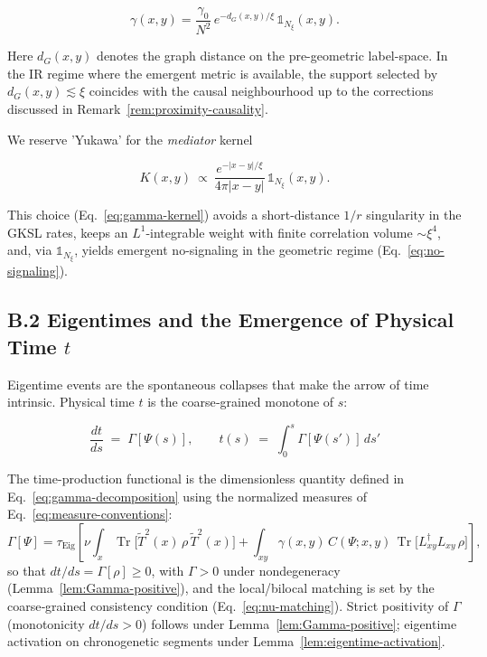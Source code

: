 \documentclass[12pt,a4paper]{article}
\renewcommand{\Tr}{\operatorname{Tr}}
\numberwithin{equation}{section}
\begin{document}
\vspace{0.5cm}

\[
\gamma(x,y)=\frac{\gamma_0}{N^2}\,e^{-d_G(x,y)/\xi}\,\mathbb{1}_{N_\xi}(x,y).
\]

\noindent Here $d_G(x,y)$ denotes the graph distance on the pre-geometric
label-space. In the IR regime where the emergent metric is available, the
support selected by $d_G(x,y)\lesssim \xi$ coincides with the causal
neighbourhood up to the corrections discussed in
Remark~\ref{rem:proximity-causality}.

\vspace{0.5cm}
\noindent We reserve 'Yukawa' for the \emph{mediator} kernel

\vspace{0.5cm}
\[
K(x,y)\ \propto\ \frac{e^{-|x-y|/\xi}}{4\pi |x-y|}\,\mathbb{1}_{N_\xi}(x,y).
\]

\vspace{0.5cm}

\noindent This choice (Eq.~\eqref{eq:gamma-kernel}) avoids a short-distance $1/r$ singularity in the GKSL rates, keeps an $L^1$-integrable weight with finite correlation volume $\sim\xi^4$, and, via $\mathbb{1}_{N_\xi}$, yields emergent no-signaling in the geometric regime (Eq.~\eqref{eq:no-signaling}). 

\vspace{0.8cm}

\subsection*{B.2 Eigentimes and the Emergence of Physical Time $t$}

\vspace{0.5cm}

Eigentime events are the spontaneous collapses that make the arrow of time intrinsic. Physical time $t$ is the coarse‑grained monotone of $s$:

\vspace{0.5cm}

\[
\frac{dt}{ds} \;=\; \Gamma[\Psi(s)],
\qquad
t(s) \;=\; \int_0^{s} \Gamma[\Psi(s')]\,ds'
\]

\vspace{0.5cm}

\noindent The time-production functional is the dimensionless quantity defined in
Eq.~\eqref{eq:gamma-decomposition} using the normalized measures of Eq.~\eqref{eq:measure-conventions}:
\[
\Gamma[\Psi] = \tau_{\mathrm{Eig}} \left[
\nu \int_x \Tr\bigl[\tilde{T}^2(x)\,\rho\,\tilde{T}^2(x)\bigr]
+ \int_{xy} \gamma(x,y)\,C(\Psi;x,y)\,\Tr\bigl[L_{xy}^\dagger L_{xy}\,\rho\bigr]
\right],
\]
so that $dt/ds=\Gamma[\rho]\ge 0$, with $\Gamma>0$ under nondegeneracy (Lemma~\ref{lem:Gamma-positive}), and the local/bilocal matching is set by the coarse‑grained consistency condition (Eq.~\eqref{eq:nu-matching}). Strict positivity of $\Gamma$ (monotonicity $dt/ds>0$) follows under Lemma~\ref{lem:Gamma-positive}; eigentime activation on chronogenetic segments under Lemma~\ref{lem:eigentime-activation}.
\end{document}
